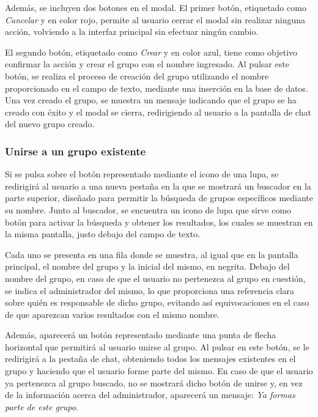 \documentclass{article}
\begin{document}
Además, se incluyen dos botones en el modal. El primer botón, etiquetado como \textit{Cancelar} y en color rojo, permite al usuario cerrar el modal sin realizar ninguna acción, volviendo a la interfaz principal sin efectuar ningún cambio.

El segundo botón, etiquetado como \textit{Crear} y en color azul, tiene como objetivo confirmar la acción y crear el grupo con el nombre ingresado. Al pulsar este botón, se realiza el proceso de creación del grupo utilizando el nombre proporcionado en el campo de texto, mediante una inserción en la base de datos. Una vez creado el grupo, se muestra un mensaje indicando que el grupo se ha creado con éxito y el modal se cierra, redirigiendo al usuario a la pantalla de chat del nuevo grupo creado.

\subsubsection{Unirse a un grupo existente}

Si se pulsa sobre el botón representado mediante el icono de una lupa, se redirigirá al usuario a una nueva pestaña en la que se mostrará un buscador en la parte superior, diseñado para permitir la búsqueda de grupos específicos mediante su nombre. Junto al buscador, se encuentra un icono de lupa que sirve como botón para activar la búsqueda y obtener los resultados, los cuales se muestran en la misma pantalla, justo debajo del campo de texto.

Cada uno se presenta en una fila donde se muestra, al igual que en la pantalla principal, el nombre del grupo y la inicial del mismo, en negrita. Debajo del nombre del grupo, en caso de que el usuario no pertenezca al grupo en cuestión, se indica el administrador del mismo, lo que proporciona una referencia clara sobre quién es responsable de dicho grupo, evitando así equivocaciones en el caso de que aparezcan varios resultados con el mismo nombre.

Además, aparecerá un botón representado mediante una punta de flecha horizontal que permitirá al usuario unirse al grupo. Al pulsar en este botón, se le redirigirá a la pestaña de chat, obteniendo todos los mensajes existentes en el grupo y haciendo que el usuario forme parte del mismo. En caso de que el usuario ya pertenezca al grupo buscado, no se mostrará dicho botón de unirse y, en vez de la información acerca del administrador, aparecerá un mensaje: \textit{Ya formas parte de este grupo}.
\end{document}
